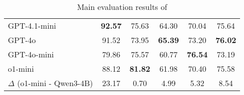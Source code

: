 \begin{table*}[!ht]
{\begin{tabular}{l|cccc|c}
GPT-4.1-mini~\cite{openai2025gpt41}             & \textbf{92.57}  & 75.63          & 64.30           & 70.04          & 75.64                    \\
GPT-4o~\cite{Hurst2024GPT4oSC}                   & 91.52           & 73.95          & \textbf{65.39}  & 73.20          & \textbf{76.02}           \\
GPT-4o-mini~\cite{Hurst2024GPT4oSC}              & 79.86           & 75.57          & 60.77           & \textbf{76.54} & 73.19                    \\
o1-mini~\cite{Contributors2024OpenAIOS}                  & 88.12           & \textbf{81.82} & 61.98           & 70.40          & 75.58                    \\

\midrule
\rowcolor{LightCyan}
$\Delta$ (o1-mini - Qwen3-4B) & 23.17 & 0.70 & 4.99 & 5.32 & 8.54 \\
\bottomrule
\end{tabular}
}
\caption{Main evaluation results of \structeval }
\label{tab:main_results}
\end{table*}
